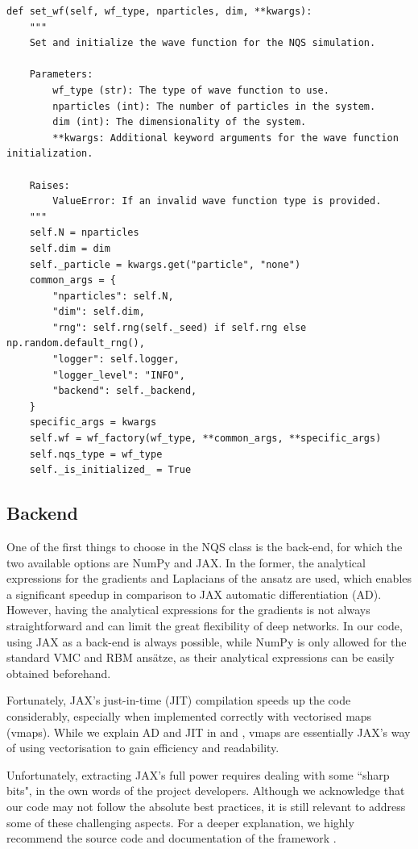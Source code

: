 \begin{lstlisting}
def set_wf(self, wf_type, nparticles, dim, **kwargs):
    """
    Set and initialize the wave function for the NQS simulation.

    Parameters:
        wf_type (str): The type of wave function to use.
        nparticles (int): The number of particles in the system.
        dim (int): The dimensionality of the system.
        **kwargs: Additional keyword arguments for the wave function initialization.

    Raises:
        ValueError: If an invalid wave function type is provided.
    """
    self.N = nparticles
    self.dim = dim
    self._particle = kwargs.get("particle", "none")
    common_args = {
        "nparticles": self.N,
        "dim": self.dim,
        "rng": self.rng(self._seed) if self.rng else np.random.default_rng(),
        "logger": self.logger,
        "logger_level": "INFO",
        "backend": self._backend,
    }
    specific_args = kwargs
    self.wf = wf_factory(wf_type, **common_args, **specific_args)
    self.nqs_type = wf_type
    self._is_initialized_ = True
\end{lstlisting}

\subsection{Backend}\label{sec:jax}
One of the first things to choose in the NQS class is the back-end, for which the two available options are NumPy \cite{harris2020array} and JAX. In the former, the analytical expressions for the gradients and Laplacians of the ansatz are used, which enables a significant speedup in comparison to JAX automatic differentiation (AD).  However, having the analytical expressions for the gradients is not always straightforward and can limit the great flexibility of deep networks. In our code, using JAX as a back-end is always possible, while NumPy is only allowed for the standard VMC and RBM ansätze, as their analytical expressions can be easily obtained beforehand.

Fortunately, JAX's just-in-time (JIT) compilation speeds up the code considerably, especially when implemented correctly with vectorised maps (vmaps). While we explain AD and JIT in  and , vmaps are essentially JAX's way of using vectorisation to gain efficiency and readability. 

Unfortunately, extracting JAX's full power requires dealing with some ``sharp bits", in the own words of the project developers. Although we acknowledge that our code may not follow the absolute best practices, it is still relevant to address some of these challenging aspects. For a deeper explanation, we highly recommend the source code and documentation of the framework \cite{bradbury2018jax}.


